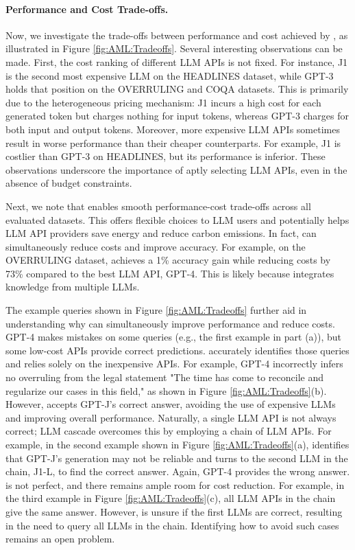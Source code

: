 \documentclass{article}
\begin{document}
\paragraph{Performance and Cost Trade-offs.}
Now, we investigate the trade-offs between performance and cost achieved by \systemFGPT{}, as illustrated in Figure \ref{fig:AML:Tradeoffs}. Several interesting observations can be made. First, the cost ranking of different LLM APIs is not fixed. For instance, J1 is the second most expensive LLM on the HEADLINES dataset, while GPT-3 holds that position on the OVERRULING and COQA datasets. This is primarily due to the heterogeneous pricing mechanism: J1 incurs a high cost for each generated token but charges nothing for input tokens, whereas GPT-3 charges for both input and output tokens. Moreover, more expensive LLM APIs sometimes result in worse performance than their cheaper counterparts. For example, J1 is costlier than GPT-3 on HEADLINES, but its performance is inferior. These observations underscore the importance of aptly selecting LLM APIs, even in the absence of budget constraints.

Next, we note that \systemFGPT{} enables smooth performance-cost trade-offs across all evaluated datasets. This offers flexible choices to LLM users and potentially helps LLM API providers save energy and reduce carbon emissions. In fact, \systemFGPT{} can simultaneously reduce costs and improve accuracy. For example, on the OVERRULING dataset, \systemFGPT{} achieves a 1\% accuracy gain while reducing costs by 73\% compared to the best LLM API, GPT-4. This is likely because \systemFGPT{} integrates knowledge from multiple LLMs. 

The example queries shown in Figure \ref{fig:AML:Tradeoffs} further aid in understanding why \systemFGPT{} can simultaneously improve performance and reduce costs. GPT-4 makes mistakes on some queries (e.g., the first example in part (a)), but some low-cost APIs provide correct predictions. \systemFGPT{} accurately identifies those queries and relies solely on the inexpensive APIs. For example, GPT-4 incorrectly infers no overruling from the legal statement "The time has come to reconcile and regularize our cases in this field," as shown in Figure \ref{fig:AML:Tradeoffs}(b). However, \systemFGPT{} accepts GPT-J's correct answer, avoiding the use of expensive LLMs and improving overall performance. Naturally, a single LLM API is not always correct; LLM cascade overcomes this by employing a chain of LLM APIs. For example, in the second example shown in Figure \ref{fig:AML:Tradeoffs}(a), \systemFGPT{} identifies that GPT-J's generation may not be reliable and turns to the second LLM in the chain, J1-L, to find the correct answer. Again, GPT-4 provides the wrong answer. \systemFGPT{} is not perfect, and there remains ample room for cost reduction. For example, in the third example in Figure \ref{fig:AML:Tradeoffs}(c), all LLM APIs in the chain give the same answer. However, \systemFGPT{} is unsure if the first LLMs are correct, resulting in the need to query all LLMs in the chain. Identifying how to avoid such cases remains an open problem.
\end{document}
